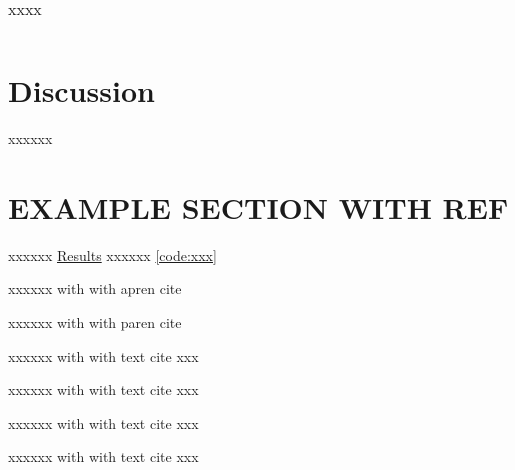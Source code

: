 \documentclass[a4paper, 11pt]{article}
\begin{document}
    \begin{table}[h]
        \centering
        \small
\begin{tabular}{|c|c|c|} %

\end{tabular}
    \caption{xxxx} %
    \label{tab:xxx} %
    \end{table}
\hline

    \section*{Discussion}
    \label{sec:discussion}
    xxxxxx
    \section*{EXAMPLE SECTION WITH REF}
    xxxxxx 
    \hyperref[sec:results]{Results}
    xxxxxx 
    \autoref{code:xxx}

    xxxxxx with with apren cite 
    \parencite{Segeqick2011Alg4th}

    xxxxxx with with paren cite 
    \parencite{CormenThomasH2022ItA}

    xxxxxx with with text cite 
    \textcite{Segeqick2011Alg4th}
    xxx

    xxxxxx with with text cite 
    \citep{Segeqick2011Alg4th}
    xxx

    xxxxxx with with text cite 
    \citet{Segeqick2011Alg4th}
    xxx

    xxxxxx with with text cite 
    \citep{CormenThomasH2022ItA}
    xxx


\printbibliography
\end{document}
